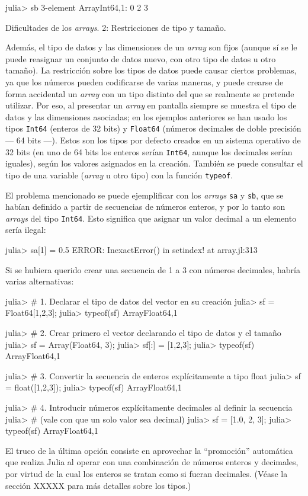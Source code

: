﻿\documentclass{article}
\newcommand{\jl}{\texttt}
\begin{document}
julia> sb
3-element Array{Int64,1}:
 0
 2
 3


Dificultades de los \emph{arrays}. 2: Restricciones de tipo y tamaño.

Además, el tipo de datos y las dimensiones de un \emph{array} son fijos (aunque sí se le puede reasignar un conjunto de datos nuevo, con otro tipo de datos u otro tamaño). La restricción sobre los tipos de datos puede causar ciertos problemas, ya que los números pueden codificarse de varias maneras, y puede crearse de forma accidental un \emph{array} con un tipo distinto del que se realmente se pretende utilizar. Por eso, al presentar un \emph{array} en pantalla siempre se muestra el tipo de datos y las dimensiones asociadas; en los ejemplos anteriores se han usado los tipos \jl{Int64} (enteros de 32 bits) y \jl{Float64} (números decimales de doble precisión --- 64 bits ---). Estos son los tipos por defecto creados en un sistema operativo de 32 bits (en uno de 64 bits los enteros serían \jl{Int64}, aunque los decimales serían iguales), según los valores asignados en la creación. También se puede consultar el tipo de una variable (\emph{array} u otro tipo) con la función \jl{typeof}.

El problema mencionado se puede ejemplificar con los \emph{arrays} \jl{sa} y \jl{sb}, que se habían definido a partir de secuencias de números enteros, y por lo tanto son \emph{arrays} del tipo \jl{Int64}. Esto significa que asignar un valor decimal a un elemento sería ilegal:

julia> sa[1] = 0.5
ERROR: InexactError()
 in setindex! at array.jl:313

Si se hubiera querido crear una secuencia de 1 a 3 con números decimales, habría varias alternativas:

julia> # 1. Declarar el tipo de datos del vector en su creación
julia> sf = Float64[1,2,3];
julia> typeof(sf)
Array{Float64,1}

julia> # 2. Crear primero el vector declarando el tipo de datos y el tamaño
julia> sf = Array(Float64, 3);
julia> sf[:] = [1,2,3];
julia> typeof(sf)
Array{Float64,1}

julia> # 3. Convertir la secuencia de enteros explícitamente a tipo float
julia> sf = float([1,2,3]);
julia> typeof(sf)
Array{Float64,1}

julia> # 4. Introducir números explícitamente decimales al definir la secuencia
julia> # (vale con que un solo valor sea decimal)
julia> sf = [1.0, 2, 3];
julia> typeof(sf)
Array{Float64,1}

El truco de la última opción consiste en aprovechar la ``promoción'' automática que realiza Julia al operar con una combinación de números enteros y decimales, por virtud de la cual los enteros se tratan como si fueran decimales. (Véase la sección XXXXX para más detalles sobre los tipos.)
\end{document}
